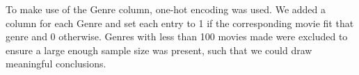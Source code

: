 \begin{multicols}{2}
        To make use of the Genre column, one-hot encoding was used.
        We added a column for each Genre and set each entry to 1 if the corresponding
            movie fit that genre and 0 otherwise.
        Genres with less than 100 movies made were excluded to ensure a large enough
            sample size was present, such that we could draw meaningful conclusions.
    \end{multicols}
